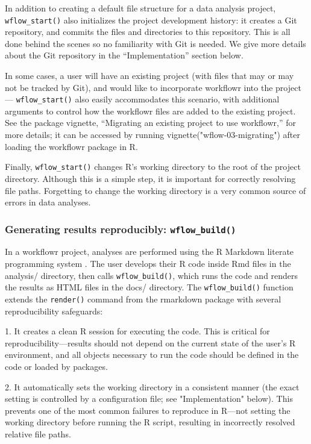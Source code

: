 \documentclass[9pt,a4paper]{extarticle}
\begin{document}
In addition to creating a default file structure for a data analysis
project, \texttt{wflow\_start()} also initializes the project development history:
it creates a Git repository, and commits the files and directories to
this repository. This is all done behind the scenes so no familiarity
with Git is needed. We give more details about the Git repository in the
“Implementation” section below.

In some cases, a user will have an existing project (with files that may
or may not be tracked by Git), and would like to incorporate workflowr
into the project --- \texttt{wflow\_start()} also easily accommodates this
scenario, with additional arguments to control how the workflowr files
are added to the existing project. See the package vignette, “Migrating
an existing project to use workflowr,” for more details; it can be
accessed by running vignette("wflow-03-migrating") after loading the
workflowr package in R.

Finally, \texttt{wflow\_start()} changes R’s working directory to the root of the
project directory. Although this is a simple step, it is important for
correctly resolving file paths. Forgetting to change the working
directory is a very common source of errors in data analyses.

\subsubsection*{Generating results reproducibly: \texttt{wflow\_build()}}

In a workflowr project, analyses are performed using the R Markdown
literate programming system \cite{Xie2018}. The user develops their R
code inside Rmd files in the analysis/ directory, then calls
\texttt{wflow\_build()}, which runs the code and renders the results as HTML files
in the docs/ directory. The \texttt{wflow\_build()} function extends the \texttt{render()}
command from the rmarkdown package with several reproducibility
safeguards:

1. It creates a clean R session for executing the code. This is critical
for reproducibility—results should not depend on the current state of
the user's R environment, and all objects necessary to run the code
should be defined in the code or loaded by packages.

2. It automatically sets the working directory in a consistent manner
(the exact setting is controlled by a configuration file; see
"Implementation" below). This prevents one of the most common failures
to reproduce in R—not setting the working directory before running the R
script, resulting in incorrectly resolved relative file paths.
\end{document}
